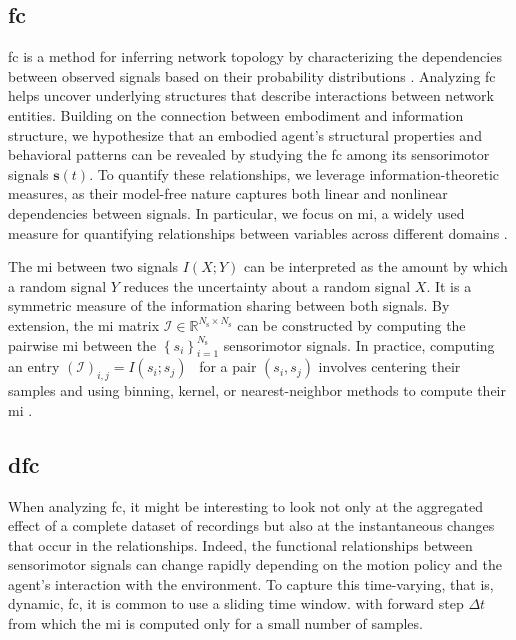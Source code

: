 \documentclass[letterpaper, 10 pt, conference]{ieeeconf}  %
\begin{document}
\subsection{\Acl{fc}}
\ac{fc} is a method for inferring network topology by characterizing the dependencies between observed signals based on their probability distributions \cite{Friston2011FunctionalAE}. Analyzing \ac{fc} helps uncover underlying structures that describe interactions between network entities. Building on the connection between embodiment and information structure, we hypothesize that an embodied agent’s structural properties and behavioral patterns 
can be revealed by studying the \ac{fc} among its sensorimotor signals $\bm{s}(t)$. To quantify these relationships, we leverage information-theoretic measures, as their model-free nature captures both linear and nonlinear dependencies between signals. In particular, we focus on \ac{mi}, a widely used measure for quantifying relationships between variables across different domains \cite{Steuer2002mutualinformationdetecting}.

The \ac{mi} between two signals $I\left(X;Y\right)$ can be interpreted as the amount by which a random signal $ Y $ reduces the uncertainty about a random signal $ X $. It is a symmetric measure of the information sharing between both signals. By extension, the \ac{mi} matrix $\bm{\mathcal{I}} \in \mathbb{R}^{{N_\text{s}} \times {N_\text{s}}}$ can be constructed by computing the pairwise \ac{mi} between the $\left\lbrace s_i\right\rbrace^{N_\text{s}}_{i=1}$ sensorimotor signals. In practice, computing an entry $\left(\bm{\mathcal{I}}\right)_{i,j} = I(s_i;s_j)$~
for a pair $\left({s}_i,{s}_j\right)$ involves centering their samples and using binning, kernel, or nearest-neighbor methods to compute their \ac{mi} \cite{WaltersWilliams2009Estimationmutualinformation}.

\subsection{\Acl{dfc}}
When analyzing \ac{fc}, it might be interesting to look not only at the aggregated effect of a complete dataset of recordings but also at the instantaneous changes that occur in the relationships. Indeed, the functional relationships between sensorimotor signals can change rapidly depending on the motion policy and the agent's interaction with the environment. To capture this time-varying, that is, dynamic, \acl{fc}, it is common to use a sliding time window. %
with forward step $\Delta t$ from which the \ac{mi} is computed only for a small number of samples.
\end{document}
